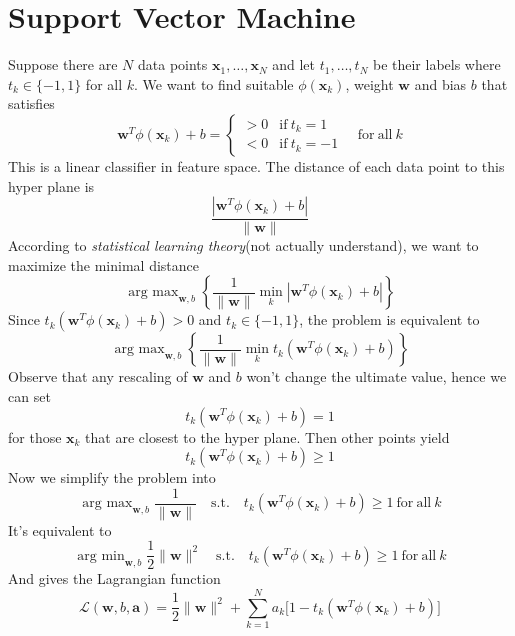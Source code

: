 \documentclass{article}
\DeclareMathOperator*{\argmax}{arg~max}
\DeclareMathOperator*{\argmin}{arg~min}
\begin{document}
    \section{Support Vector Machine}
        Suppose there are $N$ data points $\mathbf{x}_1,\dots,\mathbf{x}_N$ and let $t_1,\dots,t_N$ be their labels where $t_k\in\{-1,1\}$ for all $k$. We want to find suitable $\phi(\mathbf{x}_k)$, weight $\mathbf{w}$ and bias $b$ that satisfies
        \[
            \mathbf{w}^T \phi(\mathbf{x}_k) + b 
                    = \left\{
                    \begin{array}{rl}
                        > 0 & \mathrm{if ~} t_k = 1\\[0.2cm]
                        < 0 & \mathrm{if ~} t_k = -1
                    \end{array}
                      \right. \quad \mathrm{for~all~}k
        \]
        This is a linear classifier in feature space. The distance of each data point to this hyper plane is
        \[
            \frac { |\mathbf{w}^T \phi(\mathbf{x}_k) + b| } {\|\mathbf{w}\|}
        \]
        According to \textit{statistical learning theory}(not actually understand), we want to maximize the minimal distance
        \[
            \argmax_{\mathbf{w}, b}\left\{\frac{1}{\|\mathbf{w}\|} \min_{k} |\mathbf{w}^T \phi(\mathbf{x}_k) + b|\right\}
        \]
        Since $t_k(\mathbf{w}^T \phi(\mathbf{x}_k) + b) > 0$ and $t_k\in\{-1,1\}$, the problem is equivalent to
        \[
            \argmax_{\mathbf{w},b}\left\{\frac{1}{\|\mathbf{w}\|}\min_k t_k(\mathbf{w}^T \phi(\mathbf{x}_k) + b)\right\}
        \]
        Observe that any rescaling of $\mathbf{w}$ and $b$ won't change the ultimate value, hence we can set
        \[
            t_k (\mathbf{w}^T \phi(\mathbf{x}_k) + b) = 1
        \]
        for those $\mathbf{x}_k$ that are closest to the hyper plane. Then other points yield
        \[
            t_k (\mathbf{w}^T \phi(\mathbf{x}_k) + b) \geq 1
        \]
        Now we simplify the problem into
        \[
            \argmax_{\mathbf{w},b}\frac{1}{ \|\mathbf{w}\| } \mathrm{\quad s.t. \quad} t_k (\mathbf{w}^T \phi(\mathbf{x}_k) + b) \geq 1 \mathrm{~for~all~}k
        \]
        It's equivalent to
        \[
            \argmin_{\mathbf{w}, b}\frac{1}{2} \|\mathbf{w}\|^2 \mathrm{\quad s.t. \quad} t_k(\mathbf{w}^T \phi(\mathbf{x}_k) + b)\geq 1\mathrm{~for~all~}k
        \]
        And gives the Lagrangian function
        \[
            \mathcal{L}(\mathbf{w}, b, \mathbf{a}) = \frac{1}{2} \|\mathbf{w}\|^2 + \sum_{k=1}^N a_k \big[1 - t_k (\mathbf{w}^T \phi(\mathbf{x}_k) + b)\big]
        \]
\end{document}
